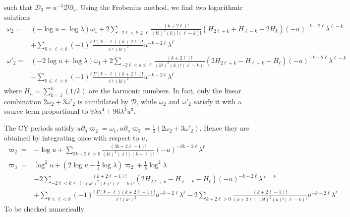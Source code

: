 \documentclass[11pt, a4paper]{article}
\def\bp#1{{\color{red} #1}}
\numberwithin{equation}{section}
\begin{document}
such that $\mathcal{D}_3= u^{-3} \mathcal{D} \partial_u$. 
Using the Frobenius method, we find two logarithmic solutions
\begin{equation}
  \begin{aligned}
  \omega_2 =& (-\log u -\log\lambda) \omega_1 + 2  
  \sum_{-2\ell<k\leq \ell} 
  \frac{(k+2\ell)!}{(k!)^2 (k)! (\ell-k)!} 
  \left( H_{2\ell+k} + H_{\ell-k} - 2 H_{k} \right) 
 (-u)^{-k-2\ell} \lambda^{\ell-k} \\ & 
 + \sum_{0\leq \ell<k} (-1)^{\ell}  \frac{\Gamma(k-\ell) (k+2\ell)!}{\ell!\, (k!)^2} 
 u^{-k-2\ell} \lambda^{\ell} 
 \\
 \omega'_2 =& (-2\log u +\log\lambda) \omega_1 + 2  
  \sum_{-2\ell<k\leq \ell} 
  \frac{(k+2\ell)!}{(k!)^2 (k)! (\ell-k)!} 
  \left( 2H_{2\ell+k} - H_{\ell-k} -  H_{\ell} \right) 
 (-u)^{-k-2\ell} \lambda^{\ell-k}\\ & 
 - \sum_{0\leq \ell<k} (-1)^{\ell}  \frac{\Gamma(k-\ell) (k+2\ell)!}{\ell!\, (k!)^2} 
 u^{-k-2\ell} \lambda^{\ell} 
  \end{aligned}
\end{equation} 
where $H_n=\sum_{k=1}^n (1/k)$ are the harmonic numbers. In fact, only the linear combination $2\omega_2+3\omega'_2$ is annihilated by $\mathcal{D}$, while
$\omega_2$ and $\omega'_2$ satisfy it with a source term proportional to $9\lambda u^4 +96 \lambda^3 u^3$. 

The CY periods satisfy $u\partial_u \varpi_2=\omega_1, u\partial_u \varpi_3=\frac14(2\omega_2+3\omega'_2)$.
Hence they are obtained by integrating once with respect to $u$,
\begin{equation}
      \begin{aligned}
  \varpi_2 =& -\log u + 
  \sum_{3k+2\ell>0} \frac{(3k+2\ell-1)!}{(k!)^2 (\ell!)(k+\ell)!} 
  (-u)^{-3k-2\ell} \lambda^{\ell}  \\
  \varpi_3 =& \log^2 u + (2\log u - \frac14 \log \lambda) \varpi_2 + \frac18 \log^2\lambda 
  \\ &
-2  \sum_{-2\ell<k\leq \ell} 
  \frac{(k+2\ell-1)!}{(k!)^2 (k)! (\ell-k)!} 
  \left( 2H_{2\ell+k} - H_{\ell-k} -  H_{\ell} \right) 
 (-u)^{-k-2\ell} \lambda^{\ell-k}\\ & 
 + \sum_{0\leq \ell<k} (-1)^{\ell}  \frac{\Gamma(k-\ell) (k+2\ell-1)!}{\ell!\, (k!)^2} 
 u^{-k-2\ell} \lambda^{\ell} 
 -2 \sum_{k+2\ell>0}  \frac{(k+2\ell-1)!}{(k+2\ell)(k!)^2 (k)! (\ell-k)!} u^{-k-2\ell} \lambda^{\ell} 
  \end{aligned}
\end{equation}
\bp{To be checked numerically}
\end{document}

